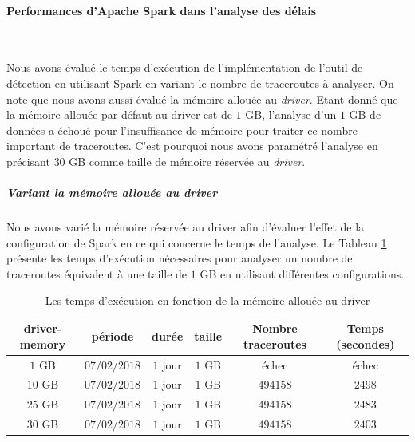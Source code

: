 \paragraph{Performances d'Apache Spark dans l'analyse des délais }~

Nous avons évalué le temps d'exécution de l'implémentation de l'outil de détection en utilisant Spark en variant le nombre de traceroutes à analyser. On note que nous avons aussi évalué la mémoire allouée au \textit{driver}. Etant donné que la mémoire allouée par défaut au driver est de $1$ GB, l'analyse  d'un $1$ GB de données  a échoué pour l'insuffisance de mémoire pour traiter ce nombre important de traceroutes. C'est pourquoi nous avons paramétré l'analyse en précisant $30$ GB comme taille de mémoire réservée au \textit{driver}.


\subparagraph{Variant la mémoire allouée au driver}

Nous avons varié la mémoire réservée au driver afin d'évaluer l'effet de la configuration de Spark en ce qui concerne le temps de l'analyse. Le Tableau 	\ref{tab:spark-timing-driver} présente les temps d'exécution nécessaires pour analyser un nombre de traceroutes équivalent à une taille de $ 1 $ GB en utilisant différentes configurations. 

\begin{table}[H]
	\captionsetup{justification=centering}
	\begin{tabular}{cccccc}
		\textbf{driver-memory}&	\textbf{période} &\textbf{durée}  & \textbf{taille}  & \textbf{Nombre traceroutes} & \textbf{Temps (secondes)}  \\ \hline
		$ 1 $ GB&	$ 07/02/2018 $&$ 1 $ jour&$ 1 $ GB& échec& échec \\ \hline 
		$ 10 $ GB&	$ 07/02/2018 $&$ 1 $ jour&$ 1 $ GB&$ 494158 $& $ 2498 $ %
		\\ \hline 
		$ 25 $ GB&	$ 07/02/2018 $&$ 1 $ jour&$ 1 $ GB&   $ 494158 $   & $ 2483 $ %
		\\ \hline
		
		$ 30 $ GB&	$ 07/02/2018 $&$ 1 $ jour&$ 1 $ GB&   $ 494158 $   & $ 2403 $ 
		\\ \hline
	
	\end{tabular}
	\caption{Les temps d'exécution en fonction de la mémoire allouée au driver }
	\label{tab:spark-timing-driver}
\end{table}


